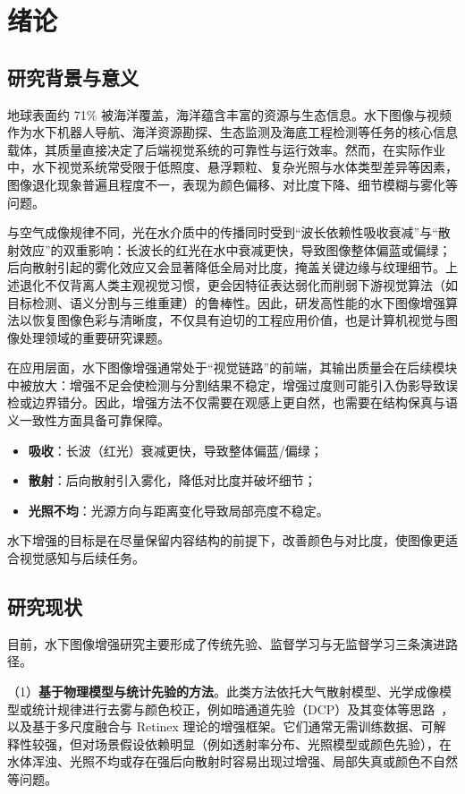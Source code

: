 \documentclass[a4paper,zihao=-4,linespread=1.25]{ctexart}
\begin{document}
\section{绪论}

\subsection{研究背景与意义}
地球表面约 71\% 被海洋覆盖，海洋蕴含丰富的资源与生态信息。水下图像与视频作为水下机器人导航、海洋资源勘探、生态监测及海底工程检测等任务的核心信息载体，其质量直接决定了后端视觉系统的可靠性与运行效率。然而，在实际作业中，水下视觉系统常受限于低照度、悬浮颗粒、复杂光照与水体类型差异等因素，图像退化现象普遍且程度不一，表现为颜色偏移、对比度下降、细节模糊与雾化等问题。

与空气成像规律不同，光在水介质中的传播同时受到“波长依赖性吸收衰减”与“散射效应”的双重影响：长波长的红光在水中衰减更快，导致图像整体偏蓝或偏绿；后向散射引起的雾化效应又会显著降低全局对比度，掩盖关键边缘与纹理细节。上述退化不仅背离人类主观视觉习惯，更会因特征表达弱化而削弱下游视觉算法（如目标检测、语义分割与三维重建）的鲁棒性。因此，研发高性能的水下图像增强算法以恢复图像色彩与清晰度，不仅具有迫切的工程应用价值，也是计算机视觉与图像处理领域的重要研究课题。

在应用层面，水下图像增强通常处于“视觉链路”的前端，其输出质量会在后续模块中被放大：增强不足会使检测与分割结果不稳定，增强过度则可能引入伪影导致误检或边界错分。因此，增强方法不仅需要在观感上更自然，也需要在结构保真与语义一致性方面具备可靠保障。
\begin{itemize}
    \item \textbf{吸收}：长波（红光）衰减更快，导致整体偏蓝/偏绿；
    \item \textbf{散射}：后向散射引入雾化，降低对比度并破坏细节；
    \item \textbf{光照不均}：光源方向与距离变化导致局部亮度不稳定。
\end{itemize}

水下增强的目标是在尽量保留内容结构的前提下，改善颜色与对比度，使图像更适合视觉感知与后续任务。

\subsection{研究现状}
目前，水下图像增强研究主要形成了传统先验、监督学习与无监督学习三条演进路径。

（1）\textbf{基于物理模型与统计先验的方法}。此类方法依托大气散射模型、光学成像模型或统计规律进行去雾与颜色校正，例如暗通道先验（DCP）及其变体等思路~\cite{5,6}，以及基于多尺度融合与 Retinex 理论的增强框架。它们通常无需训练数据、可解释性较强，但对场景假设依赖明显（例如透射率分布、光照模型或颜色先验），在水体浑浊、光照不均或存在强后向散射时容易出现过增强、局部失真或颜色不自然等问题。
\end{document}

